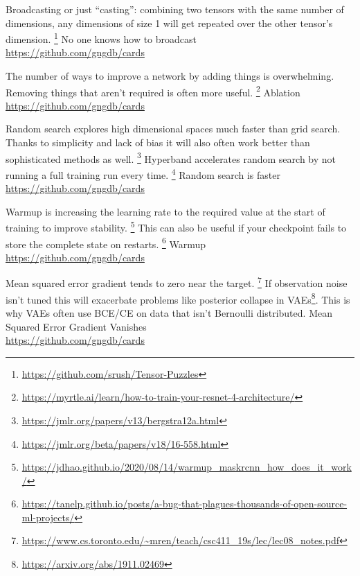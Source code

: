\documentclass[grid,avery5371]{flashcards}
\newcommand{\cb}[1]{#1 \\ {\small \url{https://github.com/gngdb/cards}}}
\begin{document}
\begin{flashcard}[srush]{%
Broadcasting or just ``casting'': combining two tensors
with the same number of dimensions, any dimensions of size 1 will
get repeated over the other tensor's dimension.
\footnote{\small \url{https://github.com/srush/Tensor-Puzzles}}
}
\cb{No one knows how to broadcast}
\end{flashcard}

\begin{flashcard}[davidcpage]{%
The number of ways to improve a network by adding things is overwhelming.
Removing things that aren't required is often more useful.
\footnote{\small \url{https://myrtle.ai/learn/how-to-train-your-resnet-4-architecture/}}
}
\cb{Ablation}
\end{flashcard}

\begin{flashcard}[???]{%
Random search explores high dimensional spaces much faster than grid search.
Thanks to simplicity and lack of bias it will also often work better than
sophisticated methods as well. 
\footnote{\small \url{https://jmlr.org/papers/v13/bergstra12a.html}}
Hyperband accelerates random search by not
running a full training run every time.
\footnote{\small \url{https://jmlr.org/beta/papers/v18/16-558.html}}
}
\cb{Random search is faster}
\end{flashcard}

\begin{flashcard}[???]{%
Warmup is increasing the learning rate to the required value at the start
of training to improve stability.
\footnote{\small \url{https://jdhao.github.io/2020/08/14/warmup_maskrcnn_how_does_it_work/}}
This can also be useful if your checkpoint fails to store the
complete state on restarts.
\footnote{\small \sloppy \url{https://tanelp.github.io/posts/a-bug-that-plagues-thousands-of-open-source-ml-projects/}}
}
\cb{Warmup}
\end{flashcard}

\begin{flashcard}[Lucas]{%
Mean squared error gradient tends to zero near the target.
\footnote{\small \sloppy \url{https://www.cs.toronto.edu/~mren/teach/csc411_19s/lec/lec08_notes.pdf}}
If observation noise isn't tuned this will exacerbate problems
like posterior collapse in VAEs\footnote{\small \url{https://arxiv.org/abs/1911.02469}}.
This is why VAEs often use BCE/CE on data that isn't Bernoulli distributed.
}
\cb{Mean Squared Error Gradient Vanishes}
\end{flashcard}
\end{document}
